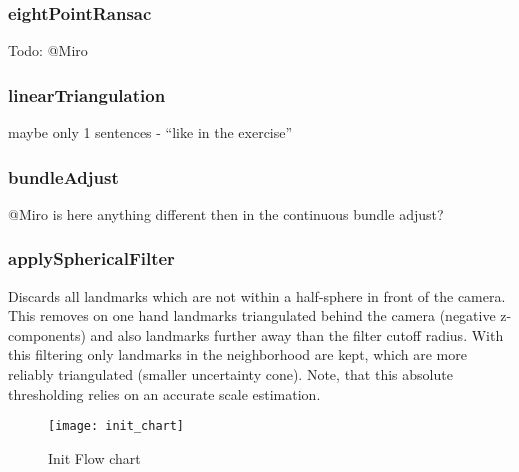 \subsubsection{eightPointRansac}
Todo: @Miro

\subsubsection{linearTriangulation}
maybe only 1 sentences - ``like in the exercise''

\subsubsection{bundleAdjust}
@Miro
is here anything different then in the continuous bundle adjust?

\subsubsection{applySphericalFilter}
\label{sub_sec_sphFilter}
Discards all landmarks which are not within a half-sphere in front of the camera. This removes on one hand landmarks triangulated behind the camera (negative z-components) and also landmarks further away than the filter cutoff radius. With this filtering only landmarks in the neighborhood are kept, which are more reliably triangulated (smaller uncertainty cone). Note, that this absolute thresholding relies on an accurate scale estimation.

\begin{figure}[ht]
	\centering
	\texttt{[image: init\_chart]}
	\caption{Init Flow chart}
	\label{img_flow_init}
\end{figure}